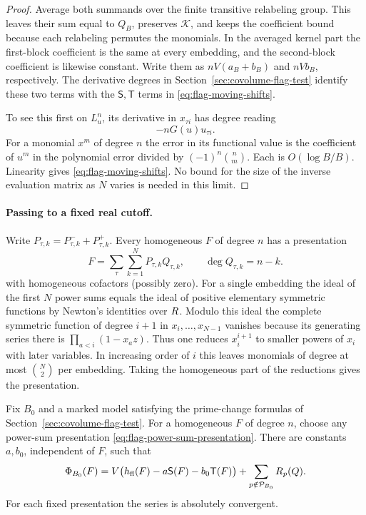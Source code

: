 \begin{proof}
Average both summands over the finite transitive relabeling
group. This leaves their sum equal to \(Q_B\), preserves
\(\mathcal K\), and keeps the coefficient bound because each
relabeling permutes the monomials. In the averaged kernel part
the first-block coefficient is the same at every embedding,
and the second-block coefficient is likewise constant.
Write them as \(nV(a_B+b_B)\) and \(nVb_B\), respectively.
The derivative degrees in Section~\ref{sec:covolume-flag-test}
identify these two terms with the \(\mathsf S,\mathsf T\) terms
in \eqref{eq:flag-moving-shifts}.

To see this first on \(L_u^n\), its derivative in \(x_{\tau i}\)
has degree reading
\[
 -nG(u)u_{\tau i}.
\]
For a monomial
\(x^m\) of degree \(n\) the error in its functional value is
the coefficient of \(u^m\) in the polynomial error divided by
\((-1)^n\binom{n}{m}\). Each is \(O(\log B/B)\). Linearity
gives \eqref{eq:flag-moving-shifts}. No bound for the size of the
inverse evaluation matrix as \(N\) varies is needed in this limit.

\end{proof}

\paragraph{Passing to a fixed real cutoff.}
Write \(P_{\tau,k}=P^-_{\tau,k}+P^+_{\tau,k}\).
Every homogeneous \(F\) of degree \(n\) has a presentation
\begin{equation}\label{eq:flag-power-sum-presentation}
 F=\sum_\tau\sum_{k=1}^N P_{\tau,k}Q_{\tau,k},
 \qquad \deg Q_{\tau,k}=n-k .
\end{equation}
with homogeneous cofactors (possibly zero). For a single
embedding the ideal of the first \(N\) power sums equals the
ideal of positive elementary symmetric functions by Newton's
identities over \(R\). Modulo this ideal the complete symmetric
function of degree \(i+1\) in \(x_i,\ldots,x_{N-1}\) vanishes because
its generating series there is \(\prod_{a<i}(1-x_a z)\).
Thus one reduces \(x_i^{i+1}\) to smaller powers of \(x_i\)
with later variables. In increasing order of \(i\) this leaves
monomials of degree at most \(\binom N2\) per embedding. Taking
the homogeneous part of the reductions gives the presentation.
\label{cor:covolume-wall-shape-3}

\begin{proposition}\label{prop:flag-fixed-prime-expansion}
Fix \(B_0\) and a marked model satisfying the prime-change
formulas of Section~\ref{sec:covolume-flag-test}.
For a homogeneous \(F\) of degree \(n\), choose any power-sum
presentation \eqref{eq:flag-power-sum-presentation}. There are constants \(a,b_0\), independent of \(F\),
such that
\[
 \Phi_{B_0}(F)=V\bigl(h_{\rm fl}(F)
                 -a\mathsf S(F)-b_0\mathsf T(F)\bigr)
                   +\sum_{p\notin\mathcal P_{B_0}}R_p(Q).
\]
For each fixed presentation the series is absolutely convergent.
\end{proposition}

